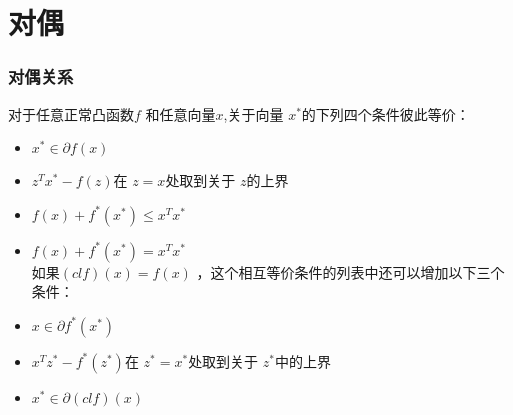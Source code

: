 \documentclass[handout,10pt]{beamer}
\begin{document}
\section{对偶}
\begin{frame}
	\frametitle{对偶关系}	
	\begin{mytheorem}对于任意正常凸函数$f$ 和任意向量$x$,关于向量 $x^{*}$的下列四个条件彼此等价： \\
		\begin{itemize}[<+->]
			\item $x^{*} \in\partial f(x)$
			\item $z^{T}x^{*}-f(z)$在 $z=x$处取到关于 $z$的上界
			\item $f(x)+f^{*}(x^{*})\leq x^{T}x^{*}$
			\item $f(x)+f^{*}(x^{*})= x^{T}x^{*}$\\
			如果$(clf)(x)=f(x)$ ，这个相互等价条件的列表中还可以增加以下三个条件：
			\item $x \in \partial f^{*}(x^{*})$
			\item  $x^{T}z^{*}-f^{*}(z^{*})$在 $z^{*}=x^{*}$处取到关于 $z^{*}$中的上界
			\item $x^{*} \in\partial (clf)(x)$
		\end{itemize}	
	\end{mytheorem}
	
\end{frame}
\end{document}
